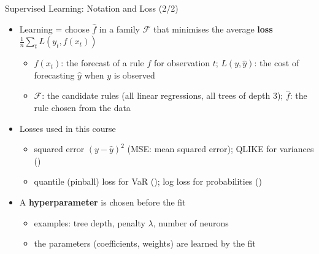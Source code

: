 \begin{frame}{Supervised Learning: Notation and Loss (2/2)}
\itemsize{\small}
\begin{itemize}
    \item Learning = choose $\hat f$ in a family $\mathcal{F}$ that minimises the average \textbf{loss} $\frac1n\sum_t L(y_t, f(x_t))$
    \begin{itemize}
        \item $f(x_t)$: the forecast of a rule $f$ for observation $t$; $L(y, \hat y)$: the cost of forecasting $\hat y$ when $y$ is observed
        \item $\mathcal{F}$: the candidate rules (all linear regressions, all trees of depth 3); $\hat f$: the rule chosen from the data
    \end{itemize}
    \item Losses used in this course
    \begin{itemize}
        \item squared error $(y - \hat y)^2$ (MSE: mean squared error); QLIKE for variances ()
        \item quantile (pinball) loss for VaR (); log loss for probabilities ()
    \end{itemize}
    \item A \textbf{hyperparameter} is chosen before the fit
    \begin{itemize}
        \item examples: tree depth, penalty $\lambda$, number of neurons
        \item the parameters (coefficients, weights) are learned by the fit
    \end{itemize}
\end{itemize}
\end{frame}

